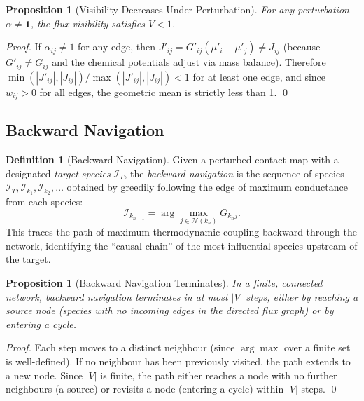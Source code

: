 \documentclass[11pt,twocolumn]{article}
\theoremstyle{plain}
\newtheorem{proposition}[theorem]{Proposition}
\theoremstyle{definition}
\newtheorem{definition}[theorem]{Definition}
\begin{document}
\begin{proposition}[Visibility Decreases Under Perturbation]
\label{prop:visibility_decrease}
For any perturbation $\alpha \neq \mathbf{1}$, the flux visibility satisfies
$V < 1$.
\end{proposition}

\begin{proof}
If $\alpha_{ij} \neq 1$ for any edge, then $J'_{ij} = G'_{ij}(\mu'_i -
\mu'_j) \neq J_{ij}$ (because $G'_{ij} \neq G_{ij}$ and the chemical
potentials adjust via mass balance). Therefore $\min(|J'_{ij}|, |J_{ij}|) /
\max(|J'_{ij}|, |J_{ij}|) < 1$ for at least one edge, and since
$w_{ij} > 0$ for all edges, the geometric mean is strictly less than 1. \qed
\end{proof}

\subsection{Backward Navigation}

\begin{definition}[Backward Navigation]
\label{def:backward}
Given a perturbed contact map with a designated \emph{target species}
$\mathcal{I}_T$, the \emph{backward navigation} is the sequence of species
$\mathcal{I}_T, \mathcal{I}_{k_1}, \mathcal{I}_{k_2}, \ldots$ obtained by
greedily following the edge of maximum conductance from each species:
\begin{equation}\label{eq:backward}
  \mathcal{I}_{k_{n+1}}
  = \arg\max_{j \in \mathcal{N}(k_n)} G_{k_n j}.
\end{equation}
This traces the path of maximum thermodynamic coupling backward through the
network, identifying the ``causal chain'' of the most influential species
upstream of the target.
\end{definition}

\begin{proposition}[Backward Navigation Terminates]
\label{prop:backward_terminates}
In a finite, connected network, backward navigation terminates in at most $|V|$
steps, either by reaching a source node (species with no incoming edges in the
directed flux graph) or by entering a cycle.
\end{proposition}

\begin{proof}
Each step moves to a distinct neighbour (since $\arg\max$ over a finite set is
well-defined). If no neighbour has been previously visited, the path extends to
a new node. Since $|V|$ is finite, the path either reaches a node with no
further neighbours (a source) or revisits a node (entering a cycle) within $|V|$
steps. \qed
\end{proof}
\end{document}
